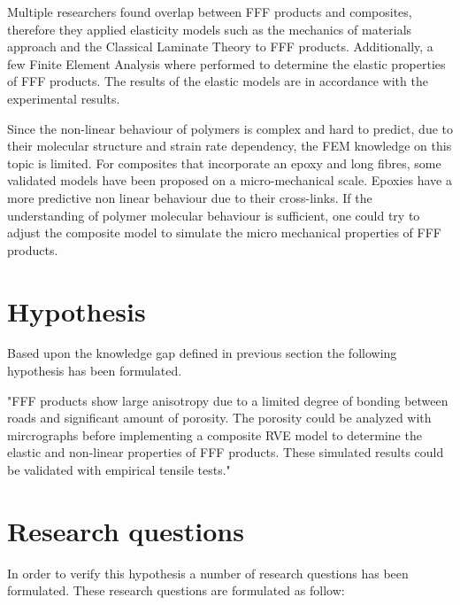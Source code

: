 Multiple researchers found overlap between FFF products and composites, therefore they applied elasticity models such as the mechanics of materials approach and the Classical Laminate Theory to FFF products. Additionally, a few Finite Element Analysis where performed to determine the elastic properties of FFF products. The results of the elastic models are in accordance with the experimental results.

Since the non-linear behaviour of polymers is complex and hard to predict, due to their molecular structure and strain rate dependency, the FEM knowledge on this topic is limited. For composites that incorporate an epoxy and long fibres, some validated models have been proposed on a micro-mechanical scale.  Epoxies have a more predictive non linear behaviour due to their cross-links. If the understanding of polymer molecular behaviour is sufficient, one could try to adjust the composite model to simulate the micro mechanical properties of FFF products. 

\section{Hypothesis}
Based upon the knowledge gap defined in previous section the following hypothesis has been formulated.

"FFF products show large anisotropy due to a limited degree of bonding between roads and significant amount of porosity. The porosity could be analyzed with mircrographs before implementing a composite RVE model to determine the elastic and non-linear properties of FFF products. These simulated results could be validated with empirical tensile tests."


\section{Research questions}
    \label{Research questions}
In order to verify this hypothesis a number of research questions has been formulated. These research questions are formulated as follow:

